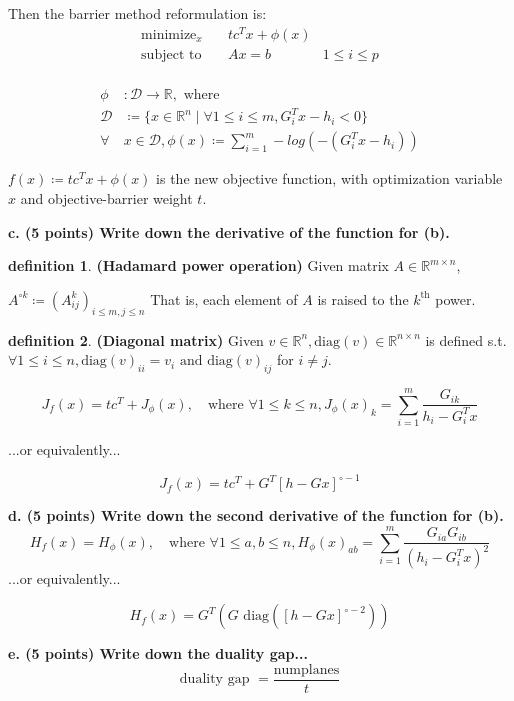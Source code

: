 \documentclass[a4paper,10pt]{article}
\theoremstyle{definition}
\newtheorem{definition}{definition}[section]
\begin{document}
Then the barrier method reformulation is: 
\[
\begin{aligned}
    \text{minimize}_{x} \quad & tc^Tx + \phi(x)\\
    \text{subject to} \quad & Ax = b \quad & 1 \leq i \leq p\\
\end{aligned}
\]

\[
\begin{aligned}
    \phi & : \mathcal{D} \rightarrow \mathbb{R}, \text{ where }\\
    \mathcal{D} & \coloneq \{x \in \mathbb{R} ^ n \mid \forall 1\leq i\leq m, G_i^Tx - h_i < 0\}\\
    \forall & x \in \mathcal{D}, \phi(x) \coloneq \sum_{i=1}^{m} -log(-(G_i^Tx - h_i))
\end{aligned}
\]

$f(x) \coloneq tc^Tx + \phi(x)$ is the new objective function,
with optimization variable $x$ and objective-barrier weight $t$.

\textbf{c. (5 points) Write down the derivative of the function for (b).}

\begin{definition} \textbf{(Hadamard power operation)}
    Given matrix $A \in \mathbb{R}^{m \times n}$,

    $A^{\circ k} \coloneq (A_{ij}^k)_{i\leq m, j \leq n}$
    That is, each element of $A$ is raised to the $k^{\text{th}}$ power.
\end{definition}

\begin{definition} \textbf{(Diagonal matrix)}
    Given $v \in \mathbb{R}^{n}, \text{diag}(v) \in \mathbb{R}^{n \times n}$ is defined s.t.
    $\forall 1\leq i\leq n, \text{diag}(v)_{ii} = v_i \text{ and diag}(v)_{ij}$ for $i \neq j$.
\end{definition}


\[
    J_f(x) = tc^T + J_{\phi}(x), \quad \text{where } \forall 1\leq k\leq n,
    J_{\phi}(x)_k = \sum_{i=1}^{m} \frac{G_{ik}}{h_i - G^T_i x}
\]

...or equivalently...

\[
    J_f(x) = tc^T + G^T[h - Gx]^{\circ -1}
\]

\textbf{d. (5 points) Write down the second derivative of the function for (b).}
\[
    H_f(x) = H_{\phi}(x), \quad \text{where } \forall 1\leq a,b \leq n,
    H_{\phi}(x)_{ab} = \sum_{i=1}^{m} \frac{G_{ia}G_{ib}}{(h_i - G^T_i x)^2}
\]
...or equivalently...

\[
    H_f(x) = G^T(G\text{ diag}([h - Gx]^{\circ-2}))
\]

\textbf{e. (5 points) Write down the duality gap...}
\[
    \text{duality gap } = \frac {\text{numplanes}}{t}
\]
\end{document}
